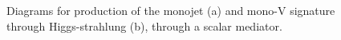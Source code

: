 \begin{figure}[htbp]
  \centering
  \caption{Diagrams for production of the monojet (a) and mono-V signature through Higgs-strahlung (b), through a scalar mediator.\label{fig:monoXfeyn}}
\end{figure}



